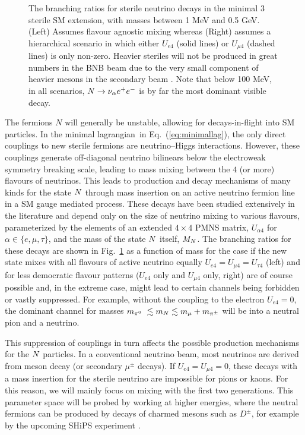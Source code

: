 \documentclass[11pt, a4paper]{article}
\newcommand{\refeq}[1]{Eq.~(\ref{#1})}
\newcommand{\reffig}[1]{Fig.~\ref{#1}}
\def\lagrangian{lagrangian}
\def\ster{\ensuremath N}
\begin{document}
\begin{figure}[t]
\caption{\label{fig:branchingratios}The branching ratios for sterile neutrino
decays in the minimal 3 sterile SM extension, with masses between 1 MeV and 0.5
GeV. (Left) Assumes flavour agnostic mixing whereas (Right) assumes a
hierarchical scenario in which either $U_{e4}$ (solid lines) or $U_{\mu 4}$
(dashed lines) is only non-zero. Heavier steriles will not be produced in great
numbers in the BNB beam due to the very small component of heavier mesons in
the secondary beam \cite{AguilarArevalo:2008yp}. Note that below 100 MeV, in
all scenarios, $\ster \rightarrow \nu_\alpha e^+ e^-$ is by far the most
dominant visible decay.}

\end{figure}

The fermions $N$ will generally be unstable, allowing for decays-in-flight into
SM particles. In the minimal \lagrangian\ in \refeq{eq:minimallag}, the only
direct couplings to new sterile fermions are neutrino--Higgs interactions.
However, these couplings generate off-diagonal neutrino bilinears below the
electroweak symmetry breaking scale, leading to mass mixing between the $4$ (or
more) flavours of neutrinos. This leads to production and decay mechanisms of
many kinds for the state $\ster$ through mass insertion on an active neutrino
fermion line in a SM gauge mediated process.  These decays have been studied
extensively in the literature \cite{Atre:2009rg} and depend only on the size of
neutrino mixing to various flavours, parameterized by the elements of an
extended $4\times4$ PMNS matrix,
%
$U_{\alpha 4}$ for $\alpha \in \{e,\mu,\tau\}$, 
%
and the mass of the state $\ster$ itself, $M_\ster$. The branching ratios for
these decays are shown in \reffig{fig:branchingratios} as a function of mass
for the case if the new state mixes with all flavours of active neutrino
equally $U_{e4}=U_{\mu 4}=U_{\tau 4}$ (left) and for less democratic flavour
patterns ($U_{e4}$ only and $U_{\mu 4}$ only, right) are of course possible
and, in the extreme case, might lead to certain channels being forbidden or
vastly suppressed. For example, without the coupling to the electron
$U_{e4}=0$, the dominant channel for masses $m_{\pi^0}~\lesssim m_\ster
\lesssim m_{\mu}+m_{\pi^\pm}$ will be into a neutral pion and a neutrino.
%

This suppression of couplings in turn affects the possible production
mechanisms for the $\ster$ particles. In a conventional neutrino beam, most
neutrinos are derived from meson decay (or secondary $\mu^\pm$ decays). If
$U_{e4}=U_{\mu 4}=0$, these decays with a mass insertion for the sterile
neutrino are impossible for pions or kaons. For this reason, we will mainly
focus on mixing with the first two generations. This parameter space will be
probed by working at higher energies, where the neutral fermions can be
produced by decays of charmed mesons such as $D^\pm$, for example by the
upcoming SHiPS experiment \cite{Alekhin:2015byh, Anelli:2015pba}.   
\end{document}
